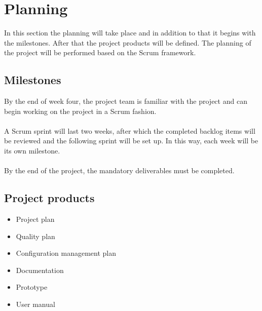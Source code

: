 \section{Planning}
In this section the planning will take place and in addition to that it begins with the milestones.
After that the project products will be defined. The planning of the project will be performed based on the Scrum framework.

    \subsection{Milestones}
    By the end of week four, the project team is familiar with the project and can begin working on the project in a Scrum fashion.\\\\
    A Scrum sprint will last two weeks, after which the completed backlog items will be reviewed and the following sprint will be set up. In this way, each week will be its own milestone.\\\\
    By the end of the project, the mandatory deliverables must be completed.
    
    \subsection{Project products}\label{sec:products}
    \begin{itemize}
        \item Project plan
        \item Quality plan
        \item Configuration management plan
        \item Documentation
        \item Prototype
        \item User manual
    \end{itemize}